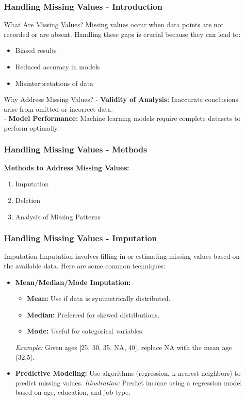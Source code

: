 \documentclass[aspectratio=169]{beamer}
\begin{document}
\begin{frame}[fragile]
    \frametitle{Handling Missing Values - Introduction}
    \begin{block}{What Are Missing Values?}
        Missing values occur when data points are not recorded or are absent. Handling these gaps is crucial because they can lead to:
    \end{block}
    \begin{itemize}
        \item Biased results
        \item Reduced accuracy in models
        \item Misinterpretations of data
    \end{itemize}
    
    \begin{block}{Why Address Missing Values?}
        - \textbf{Validity of Analysis:} Inaccurate conclusions arise from omitted or incorrect data. \\
        - \textbf{Model Performance:} Machine learning models require complete datasets to perform optimally.
    \end{block}
\end{frame}

\begin{frame}[fragile]
    \frametitle{Handling Missing Values - Methods}
    \textbf{Methods to Address Missing Values:}
    \begin{enumerate}
        \item Imputation
        \item Deletion
        \item Analysis of Missing Patterns
    \end{enumerate}
\end{frame}

\begin{frame}[fragile]
    \frametitle{Handling Missing Values - Imputation}
    \begin{block}{Imputation}
        Imputation involves filling in or estimating missing values based on the available data. Here are some common techniques:
    \end{block}
    \begin{itemize}
        \item \textbf{Mean/Median/Mode Imputation:}
            \begin{itemize}
                \item \textbf{Mean:} Use if data is symmetrically distributed.
                \item \textbf{Median:} Preferred for skewed distributions.
                \item \textbf{Mode:} Useful for categorical variables.
            \end{itemize}
            \textit{Example:} Given ages [25, 30, 35, NA, 40], replace NA with the mean age (32.5).
        \item \textbf{Predictive Modeling:} Use algorithms (regression, k-nearest neighbors) to predict missing values.
            \textit{Illustration:} Predict income using a regression model based on age, education, and job type.
    \end{itemize}
\end{frame}
\end{document}
